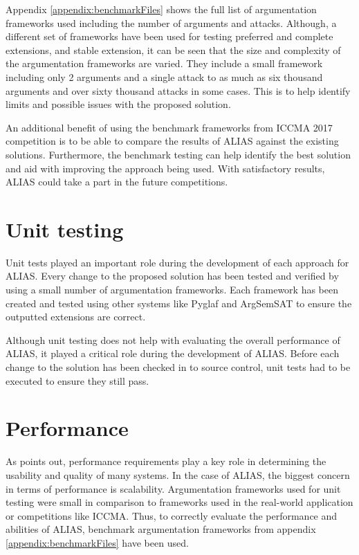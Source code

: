 Appendix \ref{appendix:benchmarkFiles} shows the full list of argumentation frameworks used including the number of arguments and attacks. Although, a different set of frameworks have been used for testing preferred and complete extensions, and stable extension, it can be seen that the size and complexity of the argumentation frameworks are varied. They include a small framework including only 2 arguments and a single attack to as much as six thousand arguments and over sixty thousand attacks in some cases. This is to help identify limits and possible issues with the proposed solution. 

An additional benefit of using the benchmark frameworks from ICCMA 2017 competition is to be able to compare the results of ALIAS against the existing solutions. Furthermore, the benchmark testing can help identify the best solution and aid with improving the approach being used. With satisfactory results, ALIAS could take a part in the future competitions.

\section{Unit testing}
Unit tests played an important role during the development of each approach for ALIAS. Every change to the proposed solution has been tested and verified by using a small number of argumentation frameworks. Each framework has been created and tested using other systems like Pyglaf and ArgSemSAT to ensure the outputted extensions are correct. 

Although unit testing does not help with evaluating the overall performance of ALIAS, it played a critical role during the development of ALIAS. Before each change to the solution has been checked in to source control, unit tests had to be executed to ensure they still pass. 

\section{Performance}
As \citet{performanceTesting1} points out, performance requirements play a key role in determining the usability and quality of many systems. In the case of ALIAS, the biggest concern in terms of performance is scalability. Argumentation frameworks used for unit testing were small in comparison to frameworks used in the real-world application or competitions like ICCMA. Thus, to correctly evaluate the performance and abilities of ALIAS, benchmark argumentation frameworks from appendix \ref{appendix:benchmarkFiles} have been used.


